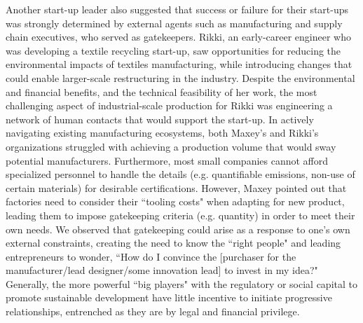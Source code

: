 Another start-up leader also suggested that success or failure for their start-ups was strongly determined by external agents such as manufacturing and supply chain executives, who served as gatekeepers. Rikki, an early-career engineer who was developing a textile recycling start-up, saw opportunities for reducing the environmental impacts of textiles manufacturing, while introducing changes that could enable larger-scale restructuring in the industry. Despite the environmental and financial benefits, and the technical feasibility of her work, the most challenging aspect of industrial-scale production for Rikki was engineering a network of human contacts that would support the start-up. In actively navigating existing manufacturing ecosystems, both Maxey's and Rikki's organizations struggled with achieving a production volume that would sway potential manufacturers. Furthermore, most small companies cannot afford specialized personnel to handle the details (e.g. quantifiable emissions, non-use of certain materials) for desirable certifications. However, Maxey pointed out that factories need to consider their ``tooling costs" when adapting for new product, leading them to impose gatekeeping criteria (e.g. quantity) in order to meet their own needs. We observed that gatekeeping could arise as a response to one's own external constraints, creating the need to know the ``right people" and leading entrepreneurs to wonder, ``How do I convince the [purchaser for the manufacturer/lead designer/some innovation lead] to invest in my idea?" Generally, the more powerful ``big players" with the regulatory or social capital to promote sustainable development have little incentive to initiate progressive relationships, entrenched as they are by legal and financial privilege.

